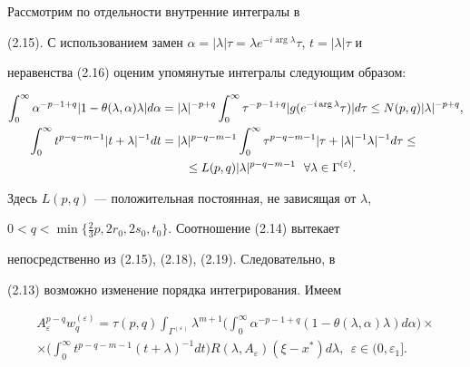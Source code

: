 Рассмотрим по отдельности внутренние интегралы в 


(2.15). С использованием замен $\alpha=|\lambda|\tau=\lambda 


e^{-i\arg\lambda}\tau$, $t=|\lambda|\tau$ и 


неравенства (2.16) оценим упомянутые интегралы следующим образом:


\begin{align}


\int^\infty_0 \alpha^{-p-1+q}|1-\theta(\lambda,\alpha)\lambda|


d\alpha&= |\lambda|^{-p+q}\int^\infty_0


\tau^{-p-1+q}|g(e^{-i\arg\lambda}\tau)|d\tau\le


N(p,q)|\lambda|^{-p+q}, \\


%


\int^\infty_0 t^{p-q-m-1}|t+\lambda|^{-1}dt&=


|\lambda|^{p-q-m-1}\int^\infty_0 \tau^{p-q-m-1}


|\tau+|\lambda|^{-1}\lambda|^{-1}d\tau\le \notag \\


&\qquad


\le L(p,q)|\lambda|^{p-q-m-1}\ \ \forall\lambda\in\Gamma^{(\varepsilon)}.


\end{align}


Здесь $L(p,q)$ --- положительная постоянная, не зависящая от $\lambda$,


$0<q<\min\{\frac{2}{3}p,2r_0,2s_0,t_0\}$. Соотношение (2.14) вытекает 


непосредственно из (2.15), (2.18), (2.19). Следовательно, в 


(2.13) возможно изменение порядка интегрирования. Имеем


\begin{multline}


A^{p-q}_\varepsilon w^{(\varepsilon)}_q= \tau(p,q)


\int_{\Gamma^{(\varepsilon)}}\lambda^{m+1}\bigg(


\int^\infty_0 \alpha^{-p-1+q}(1-\theta(\lambda,\alpha)\lambda)d\alpha


\bigg)\times \\


%


\times\bigg(\int^\infty_0 t^{p-q-m-1}(t+\lambda)^{-1}dt\bigg)


R(\lambda,A_\varepsilon)(\xi-x^*)d\lambda,


\ \ \varepsilon\in(0,\varepsilon_1].


\end{multline}


